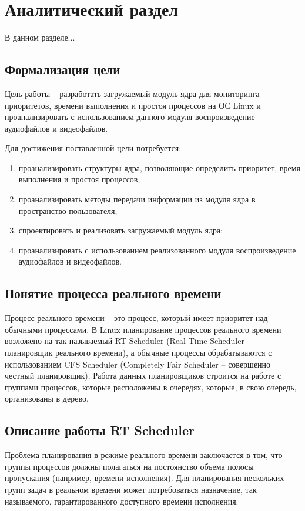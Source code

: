 \section{Аналитический раздел}
В данном разделе...

\subsection{Формализация цели}
Цель работы -- разработать загружаемый модуль ядра для мониторинга приоритетов, времени выполнения и простоя процессов на ОС Linux и проанализировать с использованием данного модуля воспроизведение аудиофайлов и видеофайлов.

Для достижения поставленной цели потребуется:
\begin{enumerate}[leftmargin=1.6\parindent]
\item проанализировать структуры ядра, позволяющие определить приоритет, время выполнения и простоя процессов;
\item проанализировать методы передачи информации из модуля ядра в пространство пользователя;
\item спроектировать и реализовать загружаемый модуль ядра;
\item проанализировать с использованием реализованного модуля воспроизведение аудиофайлов и видеофайлов.
\end{enumerate}

\subsection{Понятие процесса реального времени}
Процесс реального времени -- это процесс, который имеет приоритет над обычными процессами. В Linux планирование процессов реального времени возложено на так называемый RT Scheduler (Real Time Scheduler -- планировщик реального времени), а обычные процессы обрабатываются с использованием CFS Scheduler (Completely Fair Scheduler -- совершенно честный планировщик). Работа данных планировщиков строится на работе с группами процессов, которые расположены в очередях, которые, в свою очередь, организованы в дерево. \cite{realtimeprocesses}

\subsection{Описание работы RT Scheduler}
Проблема планирования в режиме реального времени заключается в том, что группы процессов должны полагаться на постоянство объема полосы пропускания (например, времени исполнения). Для планирования нескольких групп задач в реальном времени может потребоваться назначение, так называемого, гарантированного доступного времени исполнения. \cite{linuxkerneldocs}

